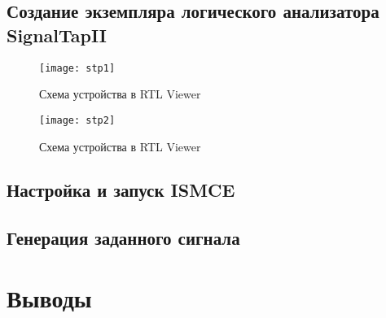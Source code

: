 \subsection{Создание экземпляра логического анализатора SignalTapII}

\begin{figure}[H]
	\centering
	\texttt{[image: stp1]}
	\caption{Схема устройства в RTL Viewer}
	\label{fig:rtl}
\end{figure}

\begin{figure}[H]
	\centering
	\texttt{[image: stp2]}
	\caption{Схема устройства в RTL Viewer}
	\label{fig:rtl}
\end{figure}

\subsection{Настройка и запуск ISMCE}

\subsection{Генерация заданного сигнала}

\section{Выводы}

